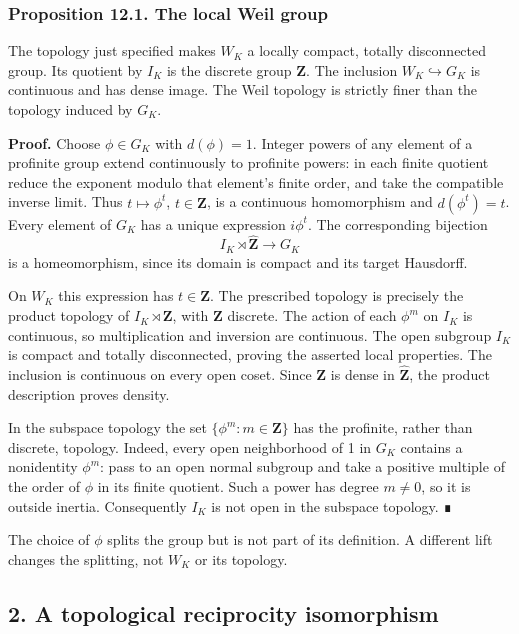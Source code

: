 \documentclass[11pt,a4paper]{article}
\begin{document}
\subsubsection{Proposition 12.1. The local Weil
group}\label{proposition-12.1.-the-local-weil-group}

The topology just specified makes \(W_K\) a locally compact, totally
disconnected group. Its quotient by \(I_K\) is the discrete group
\(\mathbf Z\). The inclusion \(W_K\hookrightarrow G_K\) is continuous
and has dense image. The Weil topology is strictly finer than the
topology induced by \(G_K\).

\textbf{Proof.} Choose \(\phi\in G_K\) with \(d(\phi)=1\). Integer
powers of any element of a profinite group extend continuously to
profinite powers: in each finite quotient reduce the exponent modulo
that element's finite order, and take the compatible inverse limit. Thus
\(t\mapsto\phi^t\), \(t\in\widehat{\mathbf Z}\), is a continuous
homomorphism and \(d(\phi^t)=t\). Every element of \(G_K\) has a unique
expression \(i\phi^t\). The corresponding bijection \[
I_K\rtimes\widehat{\mathbf Z}\longrightarrow G_K
\] is a homeomorphism, since its domain is compact and its target
Hausdorff.

On \(W_K\) this expression has \(t\in\mathbf Z\). The prescribed
topology is precisely the product topology of \(I_K\rtimes\mathbf Z\),
with \(\mathbf Z\) discrete. The action of each \(\phi^m\) on \(I_K\) is
continuous, so multiplication and inversion are continuous. The open
subgroup \(I_K\) is compact and totally disconnected, proving the
asserted local properties. The inclusion is continuous on every open
coset. Since \(\mathbf Z\) is dense in \(\widehat{\mathbf Z}\), the
product description proves density.

In the subspace topology the set \(\{\phi^m:m\in\mathbf Z\}\) has the
profinite, rather than discrete, topology. Indeed, every open
neighborhood of 1 in \(G_K\) contains a nonidentity \(\phi^m\): pass to
an open normal subgroup and take a positive multiple of the order of
\(\phi\) in its finite quotient. Such a power has degree \(m\ne0\), so
it is outside inertia. Consequently \(I_K\) is not open in the subspace
topology. ∎

The choice of \(\phi\) splits the group but is not part of its
definition. A different lift changes the splitting, not \(W_K\) or its
topology.

\subsection{2. A topological reciprocity
isomorphism}\label{a-topological-reciprocity-isomorphism}
\end{document}

